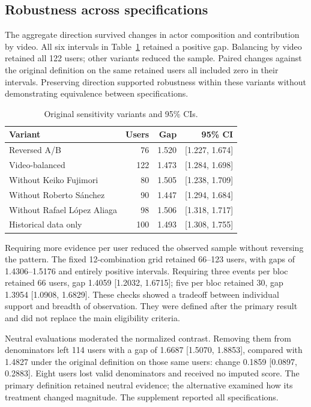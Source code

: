 \documentclass[conference, letterpaper]{IEEEtran}
\begin{document}
\subsection{Robustness across specifications}
The aggregate direction survived changes in actor composition and contribution by video. All six intervals in Table~\ref{tab:sensibilidades} retained a positive gap. Balancing by video retained all 122 users; other variants reduced the sample. Paired changes against the original definition on the same retained users all included zero in their intervals. Preserving direction supported robustness within these variants without demonstrating equivalence between specifications.
\begin{table}[t]\centering\small
\caption{Original sensitivity variants and 95\% CIs.}
\label{tab:sensibilidades}
\setlength{\tabcolsep}{3pt}
\begin{tabular}{lrrr}\toprule
Variant & Users & Gap & 95\% CI\\\midrule
Reversed A/B & 76 & 1.520 & [1.227, 1.674]\\
Video-balanced & 122 & 1.473 & [1.284, 1.698]\\
Without Keiko Fujimori & 80 & 1.505 & [1.238, 1.709]\\
Without Roberto Sánchez & 90 & 1.447 & [1.294, 1.684]\\
Without Rafael López Aliaga & 98 & 1.506 & [1.318, 1.717]\\
Historical data only & 100 & 1.493 & [1.308, 1.755]\\
\bottomrule\end{tabular}\end{table}

Requiring more evidence per user reduced the observed sample without reversing the pattern. The fixed 12-combination grid retained 66--123 users, with gaps of 1.4306--1.5176 and entirely positive intervals. Requiring three events per bloc retained 66 users, gap 1.4059 [1.2032, 1.6715]; five per bloc retained 30, gap 1.3954 [1.0908, 1.6829]. These checks showed a tradeoff between individual support and breadth of observation. They were defined after the primary result and did not replace the main eligibility criteria.

Neutral evaluations moderated the normalized contrast. Removing them from denominators left 114 users with a gap of 1.6687 [1.5070, 1.8853], compared with 1.4827 under the original definition on those same users: change 0.1859 [0.0897, 0.2883]. Eight users lost valid denominators and received no imputed score. The primary definition retained neutral evidence; the alternative examined how its treatment changed magnitude. The supplement reported all specifications.
\end{document}
